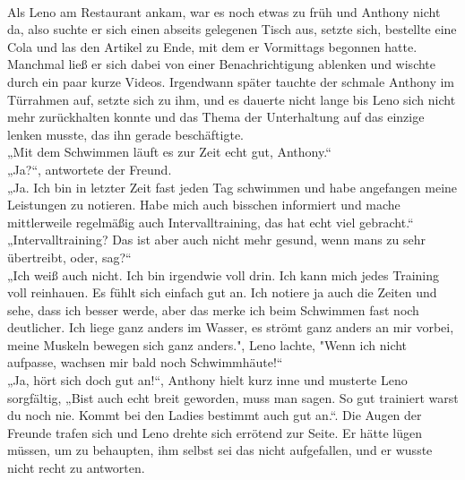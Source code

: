\documentclass[ngerman,smalldemyvopaper,11pt,oneside,onecolumn,openright,extrafontsizes]{memoir}
\begin{document}
\vspace{0.5em} \\
Als Leno am Restaurant ankam, war es noch etwas zu früh und Anthony nicht da, also suchte er sich einen abseits gelegenen Tisch aus, setzte sich, bestellte eine Cola und las den Artikel zu Ende, mit dem er Vormittags begonnen hatte. Manchmal ließ er sich dabei von einer Benachrichtigung ablenken und wischte durch ein paar kurze Videos. Irgendwann später tauchte der schmale Anthony im Türrahmen auf, setzte sich zu ihm, und es dauerte nicht lange bis Leno sich nicht mehr zurückhalten konnte und das Thema der Unterhaltung auf das einzige lenken musste, das ihn gerade beschäftigte.\\
„Mit dem Schwimmen läuft es zur Zeit echt gut, Anthony.“\\
„Ja?“, antwortete der Freund.\\
„Ja. Ich bin in letzter Zeit fast jeden Tag schwimmen und habe angefangen meine Leistungen zu notieren. Habe mich auch bisschen informiert und mache mittlerweile regelmäßig auch Intervalltraining, das hat echt viel gebracht.“\\
„Intervalltraining? Das ist aber auch nicht mehr gesund, wenn mans zu sehr übertreibt, oder, sag?“\\
„Ich weiß auch nicht. Ich bin irgendwie voll drin. Ich kann mich jedes Training voll reinhauen. Es fühlt sich einfach gut an. Ich notiere ja auch die Zeiten und sehe, dass ich besser werde, aber das merke ich beim Schwimmen fast noch deutlicher. Ich liege ganz anders im Wasser, es strömt ganz anders an mir vorbei, meine Muskeln bewegen sich ganz anders.", Leno lachte, "Wenn ich nicht aufpasse, wachsen mir bald noch Schwimmhäute!“\\
„Ja, hört sich doch gut an!“, Anthony hielt kurz inne und musterte Leno sorgfältig, „Bist auch echt breit geworden, muss man sagen. So gut trainiert warst du noch nie. Kommt bei den Ladies bestimmt auch gut an.“. Die Augen der Freunde trafen sich und Leno drehte sich errötend zur Seite. Er hätte lügen müssen, um zu behaupten, ihm selbst sei das nicht aufgefallen, und er wusste nicht recht zu antworten.\\
\end{document}
